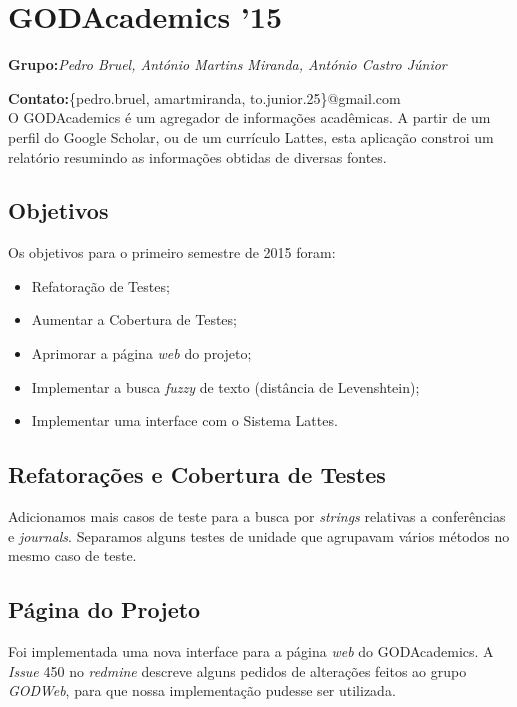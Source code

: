 \documentclass[12pt]{article}
\begin{document}
\section{GODAcademics '15}

\textbf{Grupo:}\textit{Pedro Bruel, António Martins Miranda, António Castro Júnior}

\textbf{Contato:}\{pedro.bruel, amartmiranda, to.junior.25\}@gmail.com\\

O GODAcademics é um agregador de informações acadêmicas. A partir de um perfil
do Google Scholar, ou de um currículo Lattes, esta aplicação constroi 
um relatório resumindo as informações obtidas de diversas fontes.

\subsection{Objetivos}

Os objetivos para o primeiro semestre de 2015 foram:

\begin{itemize}
    \item Refatoração de Testes;
    \item Aumentar a Cobertura de Testes;
    \item Aprimorar a página \emph{web} do projeto;
    \item Implementar a busca \emph{fuzzy} de texto (distância de Levenshtein);
    \item Implementar uma interface com o Sistema Lattes.
\end{itemize}

\subsection{Refatorações e Cobertura de Testes}

Adicionamos mais casos de teste para a busca por \emph{strings}
relativas a conferências e \emph{journals}. Separamos alguns testes
de unidade que agrupavam vários métodos no mesmo caso de teste.

\subsection{Página do Projeto}

Foi implementada uma nova interface para a página \emph{web}
do GODAcademics. A \emph{Issue} 450 no \emph{redmine} descreve
alguns pedidos de alterações feitos ao grupo \emph{GODWeb},
para que nossa implementação pudesse ser utilizada.
\end{document}
